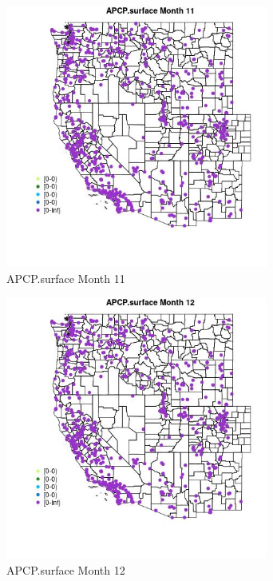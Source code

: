\begin{figure} 
\centering  
\includegraphics[width=0.77\textwidth]{Code_Outputs/Report_ML_input_PM25_Step4_part_e_de_duplicated_aves_compiled_2019-05-21wNAs_MapObsMo11APCPsurface.jpg} 
\caption{\label{fig:Report_ML_input_PM25_Step4_part_e_de_duplicated_aves_compiled_2019-05-21wNAsMapObsMo11APCPsurface}APCP.surface Month 11} 
\end{figure} 
 

\begin{figure} 
\centering  
\includegraphics[width=0.77\textwidth]{Code_Outputs/Report_ML_input_PM25_Step4_part_e_de_duplicated_aves_compiled_2019-05-21wNAs_MapObsMo12APCPsurface.jpg} 
\caption{\label{fig:Report_ML_input_PM25_Step4_part_e_de_duplicated_aves_compiled_2019-05-21wNAsMapObsMo12APCPsurface}APCP.surface Month 12} 
\end{figure} 
 

